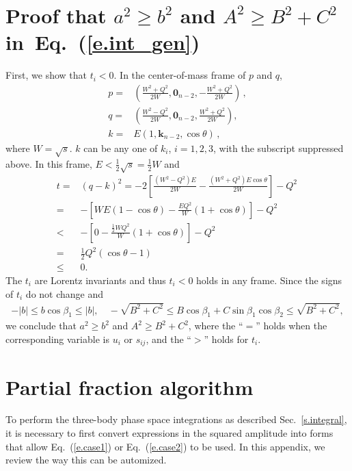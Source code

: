 \documentclass[prd,preprintnumbers,nofootinbib,superscriptaddress,onecolumn,preprint]{revtex4-1}
\newcommand\3[1]{\boldsymbol{#1}}
\newcommand{\parz}[1]{\ensuremath{\left(#1\right)}}
\newcommand{\eref}[1]{Eq.~(\ref{e.#1})}
\newcommand{\sref}[1]{Sec.~\ref{s.#1}}
\begin{document}


\section{Proof that $a^2 \geq b^2$ and $A^2 \geq B^2+C^2$ in~\eref{int_gen}}
\label{a.abABC}

First, we show that $t_i<0$. In the center-of-mass frame of $p$ and
$q$,
\begin{align}
p=&\parz{\frac{W^2+Q^2}{2W},\bm{0}_{n-2},-\frac{W^2+Q^2}{2W}} \, ,\label{e.pmom} \\
q=&\parz{\frac{W^2-Q^2}{2W},\bm{0}_{n-2},\frac{W^2+Q^2}{2W}},\label{e.qmom} \\
k=&E(1,\bm{k}_{n-2},\cos\theta) \, ,
\end{align}
where $W=\sqrt{s}$. $k$ can be any one of $k_i$, $i=1,2,3$, with the subscript
suppressed above. In this frame, $E<\frac{1}{2}\sqrt{s}=\frac{1}{2}W$ and
\begin{align}
t=&(q-k)^2=-2\left
[\frac{(W^2-Q^2)E}{2W}-\frac{(W^2+Q^2)E\cos\theta}{2W}   \right
]-Q^2 \,  \\
=&-\left [WE(1-\cos\theta)-\frac{EQ^2}{W}(1+\cos\theta)   \right ]-Q^2
\,  \\
<&-\left [ 0-\frac{\frac{1}{2}WQ^2}{W}(1+\cos\theta)\right ]-Q^2 \\
=&\frac{1}{2}Q^2(\cos\theta-1)\\
\leq &0.
\end{align}
The $t_i$ are Lorentz invariants and thus $t_i<0$ holds in any
frame.
Since the signs of $t_i$ do not change and
\begin{align}
-\lvert b\rvert \leq b\cos\beta_1 \leq \lvert b\rvert, \quad -\sqrt{B^2+C^2}\leq
B\cos\beta_1+C\sin\beta_1\cos\beta_2 \leq \sqrt{B^2+C^2},
\end{align}
we conclude that $a^2 \geq b^2$ and $A^2 \geq B^2+C^2$, where the ``$=$'' 
holds when the corresponding variable is $u_i$ or $s_{ij}$, and the
``$>$'' holds for $t_i$.

\section{Partial fraction algorithm}
\label{a.parfrac}

To perform the three-body phase space integrations as described \sref{integral},
it is necessary to first convert  expressions in the squared amplitude
into forms that allow \eref{case1} or \eref{case2} to be used. In this
appendix, we review the way this can be automized. 
\end{document}
